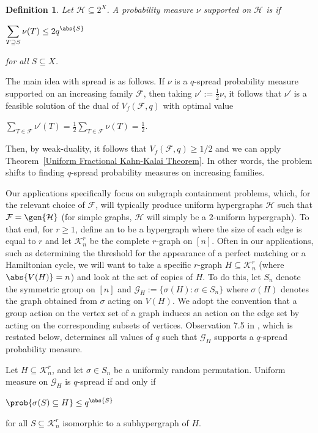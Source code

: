 \documentclass[12pt]{article}
\newtheorem*{definition*}{Definition}
\begin{document}
\begin{definition*}
Let $\mathcal{H}\subseteq 2^X$. A probability measure $\nu$ supported on $\mathcal{H}$ is  if
\begin{center}
    $\displaystyle\sum\limits_{T\supseteq S} \nu(T)\leq 2q^{\abs{S}}$
\end{center}
for all $S\subseteq X$.
\end{definition*}

The main idea with spread is as follows. If $\nu$ is a $q$-spread probability measure supported on an increasing family $\mathcal{F}$, then taking $\nu' := \frac{1}{2}\nu$, it follows that $\nu'$ is a feasible solution of the dual of $V_f(\mathcal{F},q)$ with optimal value
\begin{center}
    $\displaystyle\sum\limits_{T\in\mathcal{F}} \nu'(T) = \frac{1}{2}\sum\limits_{T\in\mathcal{F}} \nu(T) = \frac{1}{2}$.
\end{center}
Then, by weak-duality, it follows that $V_f(\mathcal{F},q)\geq 1/2$ and we can apply Theorem~\ref{Uniform Fractional Kahn-Kalai Theorem}. In other words, the problem shifts to finding $q$-spread probability measures on increasing families.

Our applications specifically focus on subgraph containment problems, which, for the relevant choice of $\mathcal{F}$, will typically produce uniform hypergraphs $\mathcal{H}$ such that $\mathcal{F} = \gen{\mathcal{H}}$ (for simple graphs, $\mathcal{H}$ will simply be a $2$-uniform hypergraph). To that end, for $r\geq 1$, define an  to be a hypergraph where the size of each edge is equal to $r$ and let $\mathcal{K}_n^r$ be the complete $r$-graph on $[n]$. Often in our applications, such as determining the threshold for the appearance of a perfect matching or a Hamiltonian cycle, we will want to take a specific $r$-graph $H\subseteq\mathcal{K}_n^r$ (where $\abs{V(H)} = n$) and look at the set of copies of $H$. To do this, let $S_n$ denote the symmetric group on $[n]$ and $\mathcal{G}_H := \{\sigma(H): \sigma\in S_n\}$ where $\sigma(H)$ denotes the graph obtained from $\sigma$ acting on $V(H)$. We adopt the convention that a group action on the vertex set of a graph induces an action on the edge set by acting on the corresponding subsets of vertices. Observation 7.5 in \cite{frankston2019thresholds}, which is restated below, determines all values of $q$ such that $\mathcal{G}_H$ supports a $q$-spread probability measure.

\begin{observation}
\label{Observation 7.5 in Fractional Paper}
Let $H\subseteq\mathcal{K}_n^r$, and let $\sigma\in S_n$ be a uniformly random permutation. Uniform measure on $\mathcal{G}_H$ is $q$-spread if and only if 
\begin{center}
    $\prob{\sigma(S)\subseteq H}\leq q^{\abs{S}}$
\end{center}
for all $S\subseteq\mathcal{K}_n^r$ isomorphic to a subhypergraph of $H$. 
\end{observation}
\end{document}
